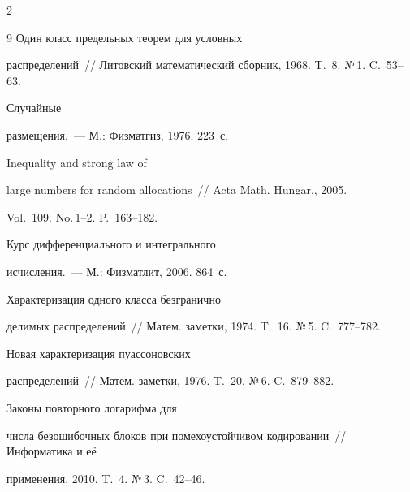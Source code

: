 \begin{multicols}{2}
{{\begin{thebibliography}{9}
 Один класс предельных теорем для условных


распределений~// Литовский математический сборник, 1968. T.~8. №\,1. C.~53--63.










 Случайные


размещения.~--- М.: Физматгиз, 1976.  223~с.







  Inequality and strong law of


large numbers for random allocations~// Acta Math. Hungar., 2005.


Vol.~109. No.\,1--2. P.~163--182.







 Курс дифференциального и интегрального


исчисления.~---  М.: Физматлит, 2006.  864~с.










  Характеризация одного класса безгранично


делимых распределений~// Матем. заметки, 1974. T.~16. №\,5. C.~777--782.










  Новая характеризация пуассоновских


распределений~// Матем. заметки, 1976. T.~20. №\,6. C.~879--882.





  \label{end\stat}







 Законы повторного логарифма для


числа безошибочных блоков при помехоустойчивом кодировании~// Информатика и её 


применения, 2010. T.~4. №\,3. C.~42--46.





 \end{thebibliography}


}


}








\end{multicols}       


